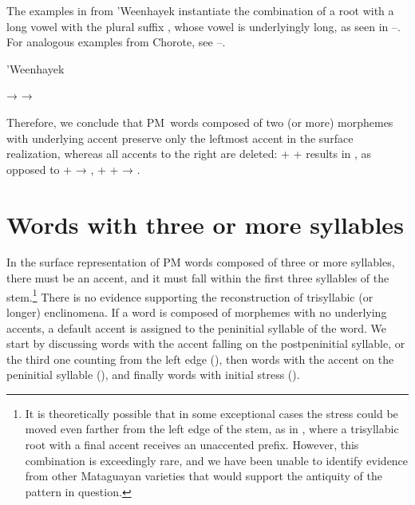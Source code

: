 The examples in  from 'Weenhayek instantiate the combination of a root with a long vowel with the plural suffix , whose vowel is underlyingly long, as seen in --. For analogous examples from Chorote, see --.

\ea\label{ex:larga-larga-pl:whk}
'Weenhayek \citep{KC16}
    \begin{xlist}
        \ex {} → 
        \ex {} → 
    \end{xlist}
\z
{}

Therefore, we conclude that PM~words composed of two (or more) morphemes with underlying accent preserve only the leftmost accent in the surface realization, whereas all accents to the right are deleted:  +  +  results in , as opposed to  +  → ,  +  +  → .

\section{Words with three or more syllables} \label{polysyllabic}

In the surface representation of PM words composed of three or more syllables, there must be an accent, and it must fall within the first three syllables of the stem.\footnote{It is theoretically possible that in some exceptional cases the stress could be moved even farther from the left edge of the stem, as in , where a trisyllabic root with a final accent receives an unaccented prefix. However, this combination is exceedingly rare, and we have been unable to identify evidence from other Mataguayan varieties that would support the antiquity of the pattern in question.} There is no evidence supporting the reconstruction of trisyllabic (or longer) enclinomena. If a word is composed of morphemes with no underlying accents, a default accent is assigned to the peninitial syllable of the word. We start by discussing words with the accent falling on the postpeninitial syllable, or the third one counting from the left edge (), then words with the accent on the peninitial syllable (), and finally words with initial stress ().

